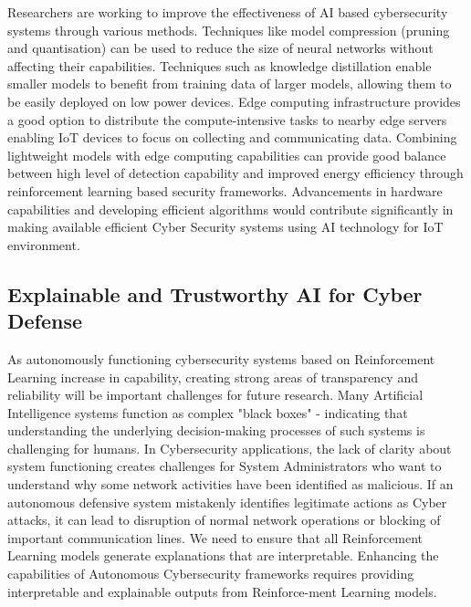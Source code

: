\documentclass[12pt]{article}
\begin{document}
Researchers are working to improve the effectiveness of AI based cybersecurity systems through various methods. Techniques like model compression (pruning and quantisation) can be used to reduce the size of neural networks without affecting their capabilities. Techniques such as knowledge distillation enable smaller models to benefit from training data of larger models, allowing them to be easily deployed on low power devices. Edge computing infrastructure provides a good option to distribute the compute-intensive tasks to nearby edge servers enabling IoT devices to focus on collecting and communicating data. Combining lightweight models with edge computing capabilities can provide good balance between high level of detection capability and improved energy efficiency through reinforcement learning based security frameworks. Advancements in hardware capabilities and developing efficient algorithms would contribute significantly in making available efficient Cyber Security systems using AI technology for IoT environment.\cite{Li2024, Nguyen2023, Palmer2024}


\subsection{Explainable and Trustworthy AI for Cyber Defense}
As autonomously functioning cybersecurity systems based on Reinforcement Learning increase in capability, creating strong areas of transparency and reliability will be important challenges for future research. Many Artificial Intelligence systems function as complex "black boxes" - indicating that understanding the underlying decision-making processes of such systems is challenging for humans. In Cybersecurity applications, the lack of clarity about system functioning creates challenges for System Administrators who want to understand why some network activities have been identified as malicious. If an autonomous defensive system mistakenly identifies legitimate actions as Cyber attacks, it can lead to disruption of normal network operations or blocking of important communication lines. We need to ensure that all Reinforcement Learning models generate explanations that are interpretable. Enhancing the capabilities of Autonomous Cybersecurity frameworks requires providing interpretable and explainable outputs from Reinforce-ment Learning models. 
\end{document}
